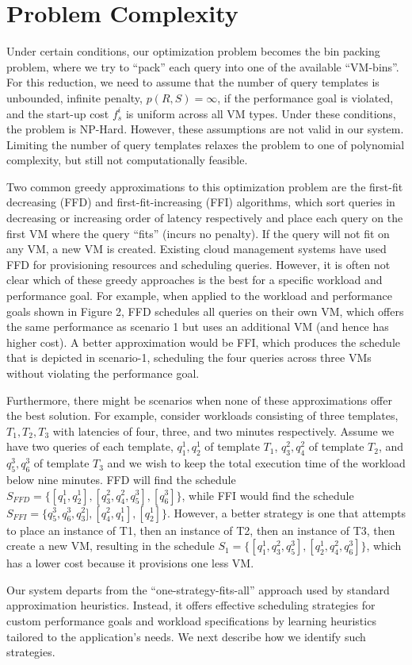 \section{Problem Complexity}
Under certain conditions, our optimization problem becomes the bin packing problem, where we try to “pack” each query into one of the available “VM-bins”. For this reduction, we need to assume that the number of query templates is unbounded, infinite penalty, \(p(R, S) = \infty\), if the performance goal is violated, and the start-up cost \(f^i_s\) is uniform across all VM types. Under these conditions, the problem is NP-Hard. However, these assumptions are not valid in our system. Limiting the number of query templates relaxes the problem to one of polynomial complexity, but still not computationally feasible. 

Two common greedy approximations to this optimization problem are the first-fit decreasing (FFD) and first-fit-increasing (FFI) algorithms, which sort queries in decreasing or increasing order of latency respectively and place each query on the first VM where the query “fits” (incurs no penalty). If the query will not fit on any VM, a new VM is created. Existing cloud management systems have used FFD  for provisioning resources and scheduling queries. However, it is often not clear which of these greedy approaches is the best for a specific workload and performance goal. For example, when applied to the workload and performance goals shown in Figure 2, FFD schedules all queries on their own VM, which offers the same performance as scenario 1 but uses an additional VM (and hence has higher cost). A better approximation would be FFI, which produces the schedule that is depicted in scenario-1, scheduling the four queries across three VMs without violating the performance goal. 

Furthermore, there might be scenarios when none of these approximations offer the best solution. For example, consider workloads consisting of three templates, \(T_1, T_2, T_3\) with latencies of four, three, and two minutes respectively. Assume we have two queries of each template, \(q^1_1, q^1_2\) of template \(T_1\), \(q^2_3, q^2_4\) of template \(T_2\), and \(q^3_5, q^3_6\) of template \(T_3\) and we wish to keep the total execution time of the workload below nine minutes. FFD will find the schedule \(S_{FFD} = \{[ q^1_1, q^1_2], [q^2_3, q^2_4, q^3_5], [q^3_6]\}\), while FFI would find the schedule \(S_{FFI} = \{q^3_5, q^3_6, q^2_3], [q^2_4, q^1_1], [q^1_2]\}\). However, a better strategy is one that attempts to place an instance of T1, then an instance of T2, then an instance of T3, then create a new VM, resulting in the schedule \(S_1 = \{[q^1_1, q^2_3, q^3_5], [q^1_2, q^2_4, q^3_6]\}\), which has a lower cost because it provisions one less VM. 

Our system departs from the “one-strategy-fits-all” approach used by standard approximation heuristics. Instead, it offers effective scheduling strategies for custom performance goals and workload specifications by learning heuristics tailored to the application’s needs. We next describe how we identify such strategies.
